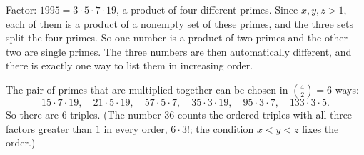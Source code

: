 Factor: $1995=3\cdot5\cdot7\cdot19$, a product of four different primes. Since $x,y,z>1$, each of them is a product of a nonempty set of these primes, and the three sets split the four primes. So one number is a product of two primes and the other two are single primes. The three numbers are then automatically different, and there is exactly one way to list them in increasing order.

The pair of primes that are multiplied together can be chosen in $\binom42=6$ ways:
\[
15\cdot7\cdot19,\quad 21\cdot5\cdot19,\quad 57\cdot5\cdot7,\quad 35\cdot3\cdot19,\quad 95\cdot3\cdot7,\quad 133\cdot3\cdot5 .
\]
So there are $\boxed{6}$ triples. (The number $36$ counts the ordered triples with all three factors greater than $1$ in every order, $6\cdot3!$; the condition $x<y<z$ fixes the order.)
